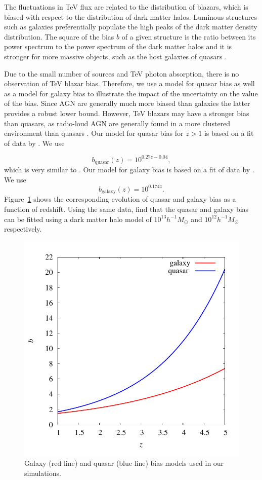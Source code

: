\documentclass[numberedappendix]{emulateapj}
\begin{document}
The fluctuations in TeV flux are related to the distribution of blazars, which is biased with respect to the distribution of dark matter halos. Luminous structures such as galaxies preferentially populate the high peaks of the dark matter density distribution. The square of the bias $b$ of a given structure is the ratio between its power spectrum to the power spectrum of the dark matter halos and it is stronger for more massive objects, such as the host galaxies of quasars \citep[see, e.g.][for a review]{2002PhR...372....1C}.

Due to the small number of sources and TeV photon absorption, there is no observation of TeV blazar bias.  Therefore, we  use a model for quasar bias as well as a model for galaxy bias to illustrate the impact of the uncertainty on the value of the bias. Since AGN are generally much more biased than galaxies the latter provides a robust lower bound. However, TeV blazars may have a stronger bias than quasars, as radio-loud AGN are generally found in a more clustered environment than quasars \citep{2009MNRAS.393..377M,2012MNRAS.421.3060S}. Our model for quasar  bias for $z>1$ is based on a fit of data by \citet{2005MNRAS.356..415C,2007ApJ...658...85M,2007AJ....133.2222S}. We use

  \begin{equation}
    \label{eq:gal_bias}
    b_{\mathrm{quasar}}(z)=10^{0.27z-0.04},
  \end{equation}
which is very similar to \citet{2012MNRAS.422..106P}. Our model for galaxy bias is based on a fit of data by \citet{2005A&A...442..801M,1998ApJ...492..428S,2006ApJ...637..631K}. We use
  \begin{equation}
    \label{eq:qso_bias}
    b_{\mathrm{galaxy}}(z)=10^{0.174z}.
  \end{equation}
Figure~\ref{fig:bias} shows the corresponding evolution of quasar and galaxy bias as a function of redshift. Using the same data, \citet{2008ApJ...678..627B} find that the quasar and galaxy bias can be fitted using a dark matter halo model of  $10^{13}h^{-1}M_{\odot}$ and $10^{12}h^{-1} M_{\odot}$ respectively. 


\begin{figure}[h]
\centering
\includegraphics[width = .4\textwidth ]{bias}
\caption{Galaxy (red line) and quasar (blue line) bias models used in our simulations.}
\label{fig:bias}
\end{figure}
\end{document}
